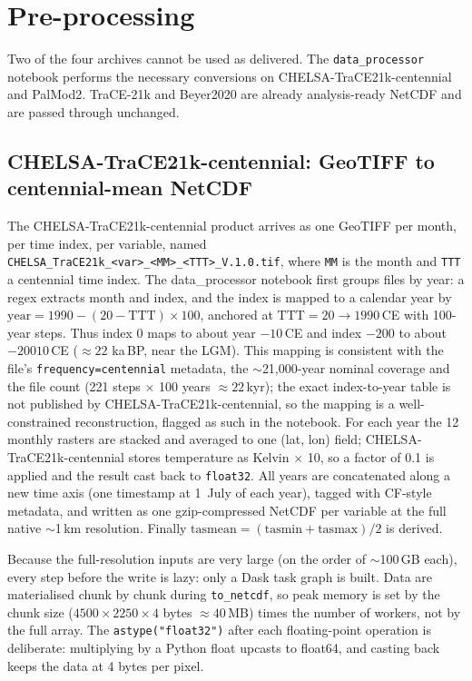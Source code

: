 \documentclass{isprs}
\newcommand{\tabbr}[1]{\texttt{#1}}
\newcommand{\kaBP}{ka\,BP}
\begin{document}
\section{Pre-processing}
Two of the four archives cannot be used as delivered. The \tabbr{data\_processor} notebook performs the necessary conversions on CHELSA-TraCE21k-centennial and PalMod2. TraCE-21k and Beyer2020 are already analysis-ready NetCDF and are passed through unchanged.

\subsection{CHELSA-TraCE21k-centennial: GeoTIFF to centennial-mean NetCDF}
The CHELSA-TraCE21k-centennial product arrives as one GeoTIFF per month, per time index, per variable, named \tabbr{CHELSA\_TraCE21k\_<var>\_<MM>\_<TTT>\_V.1.0.tif}, where \tabbr{MM} is the month and \tabbr{TTT} a centennial time index. The data\_processor notebook first groups files by year: a regex extracts month and index, and the index is mapped to a calendar year by $\mathrm{year} = 1990 - (20 - \mathrm{TTT})\times100$, anchored at $\mathrm{TTT}=20 \rightarrow 1990$\,CE with 100-year steps. Thus index 0 maps to about year $-10$\,CE and index $-200$ to about $-20010$\,CE ($\approx 22$ \kaBP, near the LGM). This mapping is consistent with the file's \tabbr{frequency=centennial} metadata, the $\sim$21,000-year nominal coverage and the file count (221 steps $\times$ 100 years $\approx 22$\,kyr); the exact index-to-year table is not published by CHELSA-TraCE21k-centennial, so the mapping is a well-constrained reconstruction, flagged as such in the notebook. For each year the 12 monthly rasters are stacked and averaged to one (lat, lon) field; CHELSA-TraCE21k-centennial stores temperature as Kelvin $\times$ 10, so a factor of 0.1 is applied and the result cast back to \tabbr{float32}. All years are concatenated along a new time axis (one timestamp at 1~July of each year), tagged with CF-style metadata, and written as one gzip-compressed NetCDF per variable at the full native $\sim$1\,km resolution. Finally $\mathrm{tasmean} = (\mathrm{tasmin}+\mathrm{tasmax})/2$ is derived. \cite{giersch2026_paleoclimate_model_comparison}

Because the full-resolution inputs are very large (on the order of $\sim$100\,GB each), every step before the write is lazy: only a Dask task graph is built. Data are materialised chunk by chunk during \tabbr{to\_netcdf}, so peak memory is set by the chunk size ($4500\times2250\times4$ bytes $\approx 40$\,MB) times the number of workers, not by the full array. The \tabbr{astype("float32")} after each floating-point operation is deliberate: multiplying by a Python float upcasts to float64, and casting back keeps the data at 4 bytes per pixel.
\end{document}
